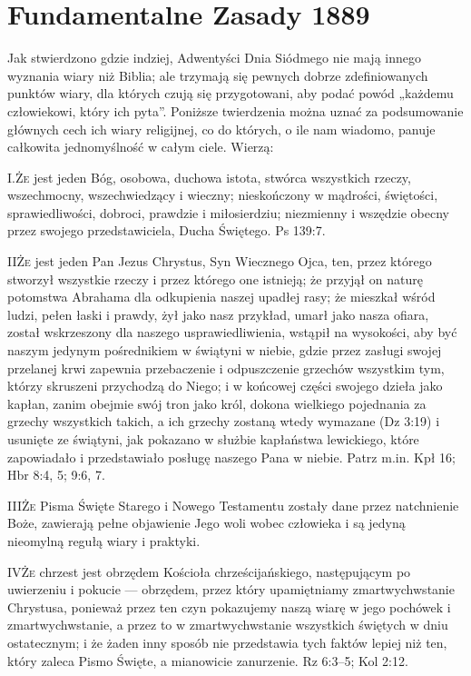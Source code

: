  \label{chap:appendix} 

\section*{Fundamentalne Zasady 1889}

Jak stwierdzono gdzie indziej, Adwentyści Dnia Siódmego nie mają innego wyznania wiary niż Biblia; ale trzymają się pewnych dobrze zdefiniowanych punktów wiary, dla których czują się przygotowani, aby podać powód „każdemu człowiekowi, który ich pyta”. Poniższe twierdzenia można uznać za podsumowanie głównych cech ich wiary religijnej, co do których, o ile nam wiadomo, panuje całkowita jednomyślność w całym ciele. Wierzą:

\lettrine{I.}{Że} jest jeden Bóg, osobowa, duchowa istota, stwórca wszystkich rzeczy, wszechmocny, wszechwiedzący i wieczny; nieskończony w mądrości, świętości, sprawiedliwości, dobroci, prawdzie i miłosierdziu; niezmienny i wszędzie obecny przez swojego przedstawiciela, Ducha Świętego. Ps 139:7.

\lettrine{II}{Że} jest jeden Pan Jezus Chrystus, Syn Wiecznego Ojca, ten, przez którego stworzył wszystkie rzeczy i przez którego one istnieją; że przyjął on naturę potomstwa Abrahama dla odkupienia naszej upadłej rasy; że mieszkał wśród ludzi, pełen łaski i prawdy, żył jako nasz przykład, umarł jako nasza ofiara, został wskrzeszony dla naszego usprawiedliwienia, wstąpił na wysokości, aby być naszym jedynym pośrednikiem w świątyni w niebie, gdzie przez zasługi swojej przelanej krwi zapewnia przebaczenie i odpuszczenie grzechów wszystkim tym, którzy skruszeni przychodzą do Niego; i w końcowej części swojego dzieła jako kapłan, zanim obejmie swój tron jako król, dokona wielkiego pojednania za grzechy wszystkich takich, a ich grzechy zostaną wtedy wymazane (Dz 3:19) i usunięte ze świątyni, jak pokazano w służbie kapłaństwa lewickiego, które zapowiadało i przedstawiało posługę naszego Pana w niebie. Patrz m.in. Kpł 16; Hbr 8:4, 5; 9:6, 7.

\lettrine{III}{Że} Pisma Święte Starego i Nowego Testamentu zostały dane przez natchnienie Boże, zawierają pełne objawienie Jego woli wobec człowieka i są jedyną nieomylną regułą wiary i praktyki.

\lettrine{IV}{Że} chrzest jest obrzędem Kościoła chrześcijańskiego, następującym po uwierzeniu i pokucie — obrzędem, przez który upamiętniamy zmartwychwstanie Chrystusa, ponieważ przez ten czyn pokazujemy naszą wiarę w jego pochówek i zmartwychwstanie, a przez to w zmartwychwstanie wszystkich świętych w dniu ostatecznym; i że żaden inny sposób nie przedstawia tych faktów lepiej niż ten, który zaleca Pismo Święte, a mianowicie zanurzenie. Rz 6:3--5; Kol 2:12.

